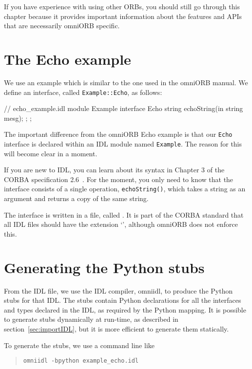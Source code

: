 \documentclass[11pt,twoside,a4paper]{book}
\newcommand{\intf}[1]{\texttt{#1}}
\newcommand{\module}[1]{\texttt{#1}}
\newcommand{\op}[1]{\texttt{#1()}}
\newcommand{\cmdline}[1]{\texttt{#1}}
\newcommand{\file}{\begingroup \urlstyle{tt}\Url}
\begin{document}
If you have experience with using other ORBs, you should still go
through this chapter because it provides important information about
the features and APIs that are necessarily omniORB specific.


\section{The Echo example}

We use an example which is similar to the one used in the omniORB
manual. We define an interface, called \intf{Example::Echo}, as
follows:

\begin{idllisting}
// echo_example.idl
module Example {
  interface Echo {
    string echoString(in string mesg);
  };
};
\end{idllisting}

The important difference from the omniORB Echo example is that our
\intf{Echo} interface is declared within an IDL module named
\module{Example}. The reason for this will become clear in a moment.

If you are new to IDL, you can learn about its syntax in Chapter 3 of
the CORBA specification 2.6~\cite{corba26-spec}. For the moment, you
only need to know that the interface consists of a single operation,
\op{echoString}, which takes a string as an argument and returns a
copy of the same string.

The interface is written in a file, called \file{example_echo.idl}. It
is part of the CORBA standard that all IDL files should have the
extension `\file{.idl}', although omniORB does not enforce this.


\section{Generating the Python stubs}
\label{sec:generatingStubs}

From the IDL file, we use the IDL compiler, omniidl, to produce the
Python stubs for that IDL. The stubs contain Python declarations for
all the interfaces and types declared in the IDL, as required by the
Python mapping. It is possible to generate stubs dynamically at
run-time, as described in section~\ref{sec:importIDL}, but it is more
efficient to generate them statically.

To generate the stubs, we use a command line like

\begin{quote}
\cmdline{omniidl -bpython example\_echo.idl}
\end{quote}
\end{document}
